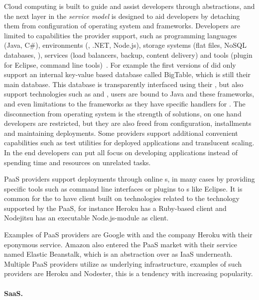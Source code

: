 Cloud computing is built to guide and assist developers through abstractions, and the next
layer in the \emph{service model} is designed to aid developers by detaching them
from configuration of operating system and frameworks.
Developers are limited to capabilities the provider support,
such as programming languages (Java, C\#), environments (, .NET, Node.js), 
storage systems (flat files, NoSQL databases, ),
services (load balancers, backup, content delivery)
and tools (plugin for Eclipse, command line tools)~\cite{nist:mell11}.
For example the first versions of  did only support
an internal key-value based database called BigTable, which is still their main database.
This database is transparently interfaced using their , 
but also support technologies such as  and ,
users are bound to Java and these frameworks, and even limitations to the frameworks
as they have specific handlers for .
The disconnection from operating system is the strength of  solutions,
on one hand developers are restricted, but they are also freed from
configuration, installments and maintaining deployments.
Some  providers support additional convenient capabilities such as
test utilities for deployed applications and translucent scaling.
In the end developers can put all focus on developing applications 
instead of spending time and resources on unrelated tasks.

PaaS providers support deployments through online s, in many cases by providing 
specific tools such as command line interfaces or plugins to s like Eclipse.
It is common for the  to have client built on technologies related to the technology supported by the PaaS,
for instance Heroku has a Ruby-based client and Nodejitsu has an executable Node.js-module as client.

Examples of PaaS providers are Google with  and
the company Heroku with their eponymous service.
Amazon also entered the PaaS market with their service named Elastic Beanstalk,
which is an abstraction over  as IaaS underneath.
Multiple PaaS providers utilize  as underlying infrastructure, examples of such
providers are Heroku and Nodester, this is a tendency with increasing popularity.

\paragraph{SaaS.}

